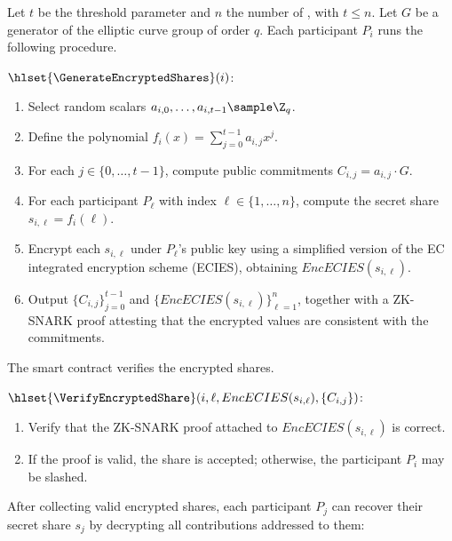 {\color{blue} Let $t$ be the threshold parameter and $n$ the number of \keywardens, with $t\leq n$. Let $G$ be a generator of the elliptic curve group of order $q$. Each participant $P_i$ runs the following procedure.

\begin{mdframed}
		\begin{itemize}
			{\color{blue} 
			\item[$\bullet$] $\hlset{\GenerateEncryptedShares}(i)$: 
			\begin{enumerate}
				\item Select random scalars $a_{i,0},\dots,a_{i,t-1} \sample \Z_q$.
				\item Define the polynomial $f_i(x) = \sum_{j=0}^{t-1} a_{i,j} x^j$.
				\item For each $j \in \{0,\dots,t-1\}$, compute public commitments $C_{i,j} = a_{i,j}\cdot G$.
				\item For each participant $P_\ell$ with index
				$\ell \in \{1,\dots,n\}$, compute the secret share $s_{i,\ell} = f_i(\ell)$.
				\item Encrypt each $s_{i,\ell}$ under $P_\ell$'s public key using a simplified version of the EC integrated encryption scheme (ECIES), obtaining $EncECIES(s_{i,\ell})$.
				\item Output $\{C_{i,j}\}_{j=0}^{t-1}$ and $\{EncECIES(s_{i,\ell})\}_{\ell=1}^n$, together with a ZK-SNARK proof attesting that the encrypted values are consistent with the commitments.
			\end{enumerate}
			}
		\end{itemize}
\end{mdframed}

The smart contract verifies the encrypted shares.

\begin{mdframed}
		\begin{itemize}
			{\color{blue} 
			\item[$\bullet$] $\hlset{\VerifyEncryptedShare}(i, \ell, EncECIES(s_{i,\ell}), \{C_{i,j}\})$: 
			\begin{enumerate}
				\item Verify that the ZK-SNARK proof attached to $EncECIES(s_{i,\ell})$ is correct.
				\item If the proof is valid, the share is accepted; otherwise, the participant $P_i$ may be slashed.
			\end{enumerate}
		}
		\end{itemize}
\end{mdframed}

After collecting valid encrypted shares, each participant $P_j$ can recover their secret share $s_j$ by decrypting all contributions addressed to them:}

